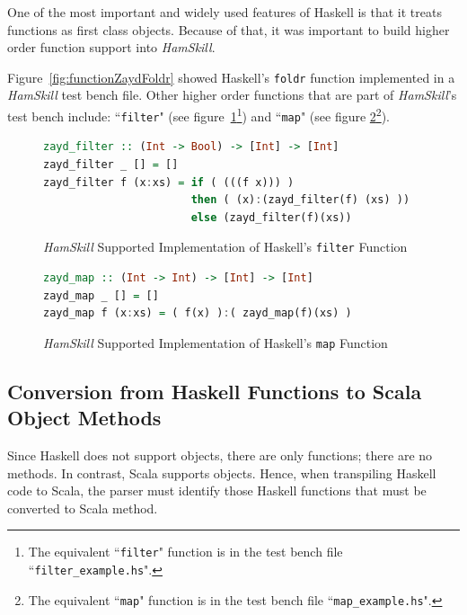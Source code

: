 \documentclass{report}
\begin{document}
One of the most important and widely used features of Haskell is that it treats functions as first class objects.  Because of that, it was important to build higher order function support into \textit{HamSkill}.

Figure~\ref{fig:functionZaydFoldr} showed Haskell's \texttt{foldr} function implemented in a \textit{HamSkill} test bench file.  Other higher order functions that are part of \textit{HamSkill}'s test bench include: ``\texttt{filter}" (see figure~\ref{fig:haskellFunctionFilter}\footnote{The equivalent ``\texttt{filter}" function is in the test bench file ``\texttt{filter\_example.hs}".}) and ``\texttt{map}" (see figure \ref{fig:haskellFunctionMap}\footnote{The equivalent ``\texttt{map}" function is in the test bench file ``\texttt{map\_example.hs}".}).

\begin{figure}[H]
\begin{mdframed}
\begin{lstlisting}[language=Haskell, basicstyle=\small]
zayd_filter :: (Int -> Bool) -> [Int] -> [Int]
zayd_filter _ [] = []
zayd_filter f (x:xs) = if ( (((f x))) )
                       then ( (x):(zayd_filter(f) (xs) ))
                       else (zayd_filter(f)(xs))
\end{lstlisting}
\end{mdframed}
\caption{\textit{HamSkill} Supported Implementation of Haskell's \texttt{filter} Function}\label{fig:haskellFunctionFilter}
\end{figure}

\begin{figure}[H]
\begin{mdframed}
\begin{lstlisting}[language=Haskell]
zayd_map :: (Int -> Int) -> [Int] -> [Int]
zayd_map _ [] = []
zayd_map f (x:xs) = ( f(x) ):( zayd_map(f)(xs) )
\end{lstlisting}
\end{mdframed}
\caption{\textit{HamSkill} Supported Implementation of Haskell's \texttt{map} Function}\label{fig:haskellFunctionMap}
\end{figure}

\subsection{Conversion from Haskell Functions to Scala Object Methods}

Since Haskell does not support objects, there are only functions; there are no methods.  In contrast, Scala supports objects.  Hence, when transpiling Haskell code to Scala, the parser must identify those Haskell functions that must be converted to Scala method.  
\end{document}
